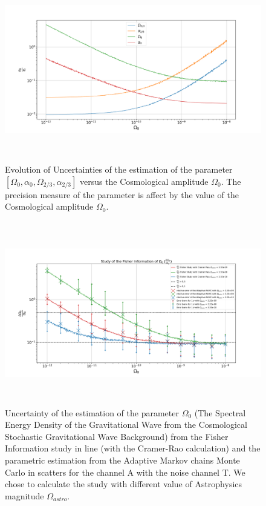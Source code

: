 \documentclass[a4paper,12pt]{article}
\begin{document}
\begin{figure}[H]
    \centering
    \includegraphics[height= 8cm]{FisherAT/Fisherii.png}
    \caption{Evolution of Uncertainties of the estimation of the parameter $[\Omega_0, \alpha_0, \Omega_{2/3}, \alpha_{2/3}]$ versus the Cosmological amplitude $\Omega_0$. The precision measure of the parameter is affect by the value of the Cosmological amplitude $\Omega_0$.}
    \label{fig:FisheriiAE}
\end{figure}

\begin{figure}[H]
    \centering
    \includegraphics[height= 8cm]{FisherAT/Uncertanity2.png}
    \caption{Uncertainty of the estimation of the parameter $\Omega_0$ (The Spectral Energy Density of the Gravitational Wave from the Cosmological Stochastic Gravitational Wave Background) from the Fisher Information study in line (with the Cramer-Rao calculation) and the parametric estimation from the Adaptive Markov chains Monte Carlo in scatters for the channel A with the noise channel T. We chose to calculate the study with different value of Astrophysics magnitude $\Omega_{astro}$.   }
    \label{fig:Fisher2}
\end{figure}
\end{document}

